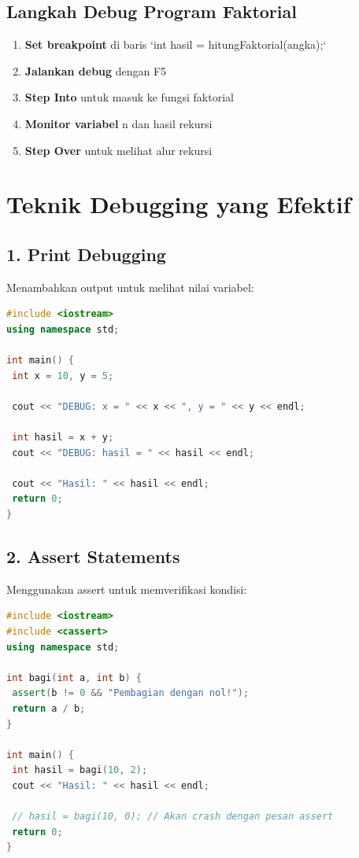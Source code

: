\subsection{Langkah Debug Program Faktorial}

\begin{enumerate}
\item \textbf{Set breakpoint} di baris `int hasil = hitungFaktorial(angka);`
\item \textbf{Jalankan debug} dengan F5
\item \textbf{Step Into} untuk masuk ke fungsi faktorial
\item \textbf{Monitor variabel} n dan hasil rekursi
\item \textbf{Step Over} untuk melihat alur rekursi
\end{enumerate}

\section{Teknik Debugging yang Efektif}

\subsection{1. Print Debugging}

Menambahkan output untuk melihat nilai variabel:

\begin{lstlisting}[language=c++, caption=Print Debugging]
#include <iostream>
using namespace std;

int main() {
 int x = 10, y = 5;

 cout << "DEBUG: x = " << x << ", y = " << y << endl;

 int hasil = x + y;
 cout << "DEBUG: hasil = " << hasil << endl;

 cout << "Hasil: " << hasil << endl;
 return 0;
}
\end{lstlisting}

\subsection{2. Assert Statements}

Menggunakan assert untuk memverifikasi kondisi:

\begin{lstlisting}[language=c++, caption=Assert Debugging]
#include <iostream>
#include <cassert>
using namespace std;

int bagi(int a, int b) {
 assert(b != 0 && "Pembagian dengan nol!");
 return a / b;
}

int main() {
 int hasil = bagi(10, 2);
 cout << "Hasil: " << hasil << endl;

 // hasil = bagi(10, 0); // Akan crash dengan pesan assert
 return 0;
}
\end{lstlisting}

